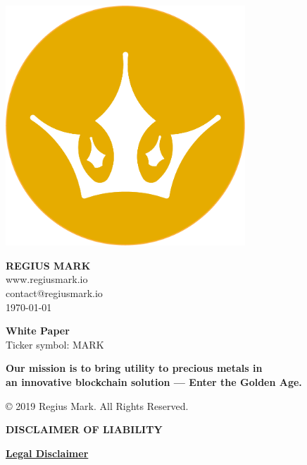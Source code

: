 \documentclass[12pt,a4paper]{article}
\begin{document}
  \begin{center}
    \includegraphics[width=90mm]{logo.png}\\
    \vspace{3mm}

    \vspace{3mm}
    \Huge{\textbf{REGIUS MARK}}\\
    \vspace{3mm}
    \normalsize{www.regiusmark.io}\\
    \normalsize{contact@regiusmark.io}\\
    \normalsize{\today}

    \vspace{30mm}
    \Large{\textbf{White Paper}}\\
    \Large{Ticker symbol: MARK}\\
    \vspace{30mm}

    \large{\textbf{Our mission is to bring utility to precious metals in}}\\
    \large{\textbf{an innovative blockchain solution --- Enter the Golden Age.}}

    \vspace*{\fill}
    \normalsize{© 2019 Regius Mark. All Rights Reserved.}
  \end{center}

  \newpage
  \begin{center}
    \large{\textbf{DISCLAIMER OF LIABILITY}}
  \end{center}


  \begin{center}
    \textbf{\underline{Legal Disclaimer}}
  \end{center}
\end{document}
